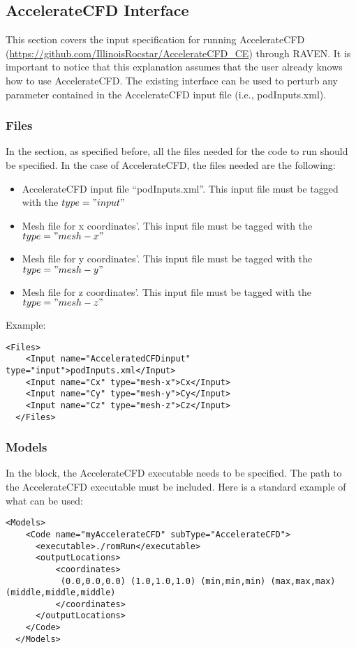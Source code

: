 \subsection{AccelerateCFD Interface}
\label{subsec:AccelerateCFDInterface}
This section covers the input specification for running AccelerateCFD
 (\url{https://github.com/IllinoisRocstar/AccelerateCFD_CE})
 through RAVEN. It is important to notice
that this explanation assumes that the user already knows how to use AccelerateCFD. The existing interface can be used to perturb any parameter
contained in the AccelerateCFD input file (i.e., podInputs.xml).

\subsubsection{Files}
In the  section, as specified before, all the files needed
for the code to run should be specified. In the case of AccelerateCFD,
the files needed are the following:
\begin{itemize}
  \item AccelerateCFD input file ``podInputs.xml''. This input file must be tagged with
          the $type="input"$
  \item Mesh file for x coordinates'. This input file must be tagged with
          the $type="mesh-x"$
  \item Mesh file for y coordinates'. This input file must be tagged with
          the $type="mesh-y"$
  \item Mesh file for z coordinates'. This input file must be tagged with
          the $type="mesh-z"$
\end{itemize}
%
Example:
\begin{lstlisting}[style=XML]
  <Files>
    <Input name="AcceleratedCFDinput" type="input">podInputs.xml</Input>
    <Input name="Cx" type="mesh-x">Cx</Input>
    <Input name="Cy" type="mesh-y">Cy</Input>
    <Input name="Cz" type="mesh-z">Cz</Input>
  </Files>
\end{lstlisting}

\subsubsection{Models}
In the  block, the AccelerateCFD executable needs to be specified.
The  path to the AccelerateCFD executable must be included.
Here is a standard example of what can be used:
\begin{lstlisting}[style=XML]
  <Models>
    <Code name="myAccelerateCFD" subType="AccelerateCFD">
      <executable>./romRun</executable>
      <outputLocations>
          <coordinates>
           (0.0,0.0,0.0) (1.0,1.0,1.0) (min,min,min) (max,max,max) (middle,middle,middle)
          </coordinates>
      </outputLocations>
    </Code>
  </Models>
\end{lstlisting}

